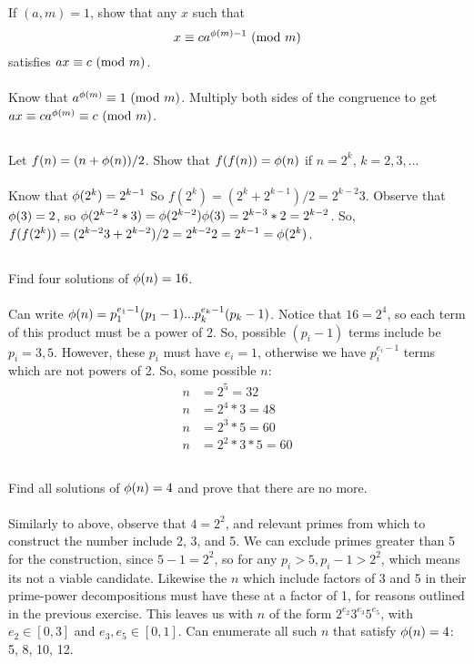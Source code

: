 \documentclass{article}
\begin{document}
\subsection{}
If $(a, m) = 1$, show that any $x$ such that
\begin{equation*}
    x \equiv ca^{\phi(m) - 1} \ (\mathrm{mod}\ m)
\end{equation*}
satisfies $ax \equiv c \ (\mathrm{mod}\ m)$.\\~\\
Know that $a^{\phi(m)} \equiv 1 \ (\mathrm{mod}\ m)$.
Multiply both sides of the congruence to get
$ax \equiv ca^{\phi(m)} \equiv c \ (\mathrm{mod}\ m)$.

\subsection{}
Let $f(n) = (n + \phi(n))/2$. Show that $f(f(n)) = \phi(n)$ if $n = 2^k$,
$k = 2, 3, ...$\\~\\
Know that $\phi(2^k) = 2^{k-1}$
So $f(2^k) = (2^k + 2^{k-1})/2 = 2^{k-2}3$.
Observe that $\phi(3) = 2$, so
$\phi(2^{k-2}*3) = \phi(2^{k-2})\phi(3) = 2^{k-3} * 2 = 2^{k-2}$.
So, $f(f(2^k)) = (2^{k-2}3 + 2^{k-2})/2 = 2^{k-2}2 = 2^{k-1} = \phi(2^k)$.

\subsection{}
Find four solutions of $\phi(n) = 16$.\\~\\
Can write $\phi(n) = p_1^{e_1-1}(p_1-1)...p_k^{e_k-1}(p_k-1)$.
Notice that $16 = 2^4$, so each term of this product must be a power of 2.
So, possible $(p_i - 1)$ terms include be $p_i = 3, 5$.
However, these $p_i$ must have $e_i = 1$, otherwise we have
$p_i^{e_i-1}$ terms which are not powers of 2.
So, some possible $n$:
\begin{align*}
    n &= 2^5 = 32\\
    n &= 2^4*3 = 48\\
    n &= 2^3*5 = 60\\
    n &= 2^2*3*5 = 60
\end{align*}

\subsection{}
Find all solutions of $\phi(n) = 4$ and prove that there are no more.\\~\\
Similarly to above, observe that $4 = 2^2$, and relevant primes from which to
construct the number include 2, 3, and 5.
We can exclude primes greater than 5 for the construction, since
$5 - 1 = 2^2$, so for any $p_i > 5, p_i - 1 > 2^2$, which means its not a viable candidate.
Likewise the $n$ which include factors of 3 and 5 in their prime-power decompositions
must have these at a factor of 1, for reasons outlined in the previous exercise.
This leaves us with $n$ of the form $2^{e_2}3^{e_3}5^{e_5}$,
with $e_2 \in [0, 3]$ and $e_3, e_5 \in [0, 1]$.
Can enumerate all such $n$ that satisfy $\phi(n) = 4$: 5, 8, 10, 12.
\end{document}
